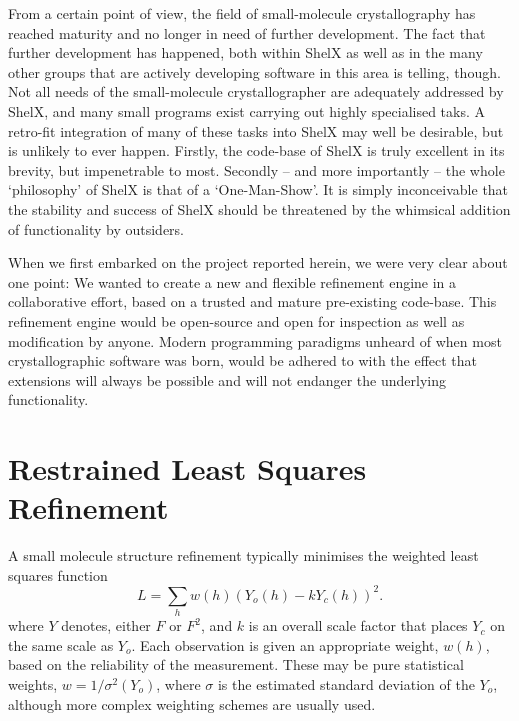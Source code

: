 \documentclass[pdf]{iucr}
\begin{document}
From a certain point of view, the field of small-molecule crystallography has reached maturity and no longer in need of further development. The fact that further development has happened, both within ShelX as well as in the many other groups that are actively developing software in this area is telling, though. Not all needs of the small-molecule crystallographer are adequately addressed by ShelX, and many small programs exist carrying out highly specialised taks. A retro-fit integration of many of these tasks into ShelX may well be desirable, but is unlikely to ever happen. Firstly, the code-base of ShelX is truly excellent in its brevity, but impenetrable to most. Secondly -- and more importantly -- the whole `philosophy' of ShelX is that of a `One-Man-Show'.  It is simply inconceivable that the stability and success of ShelX should be threatened by the whimsical addition of functionality by outsiders.

When we first embarked on the project reported herein, we were very clear about one point: We wanted to create a new and flexible refinement engine in a collaborative effort, based on a trusted and mature pre-existing code-base. This refinement engine would be open-source and open for inspection as well as modification by anyone. Modern programming paradigms unheard of when most crystallographic software was born, would be adhered to with the effect that extensions will always be possible and will not endanger the underlying functionality.


\section{Restrained Least Squares Refinement}
\label{sec:restraints}

A small molecule structure refinement typically minimises the weighted least squares function
\begin{equation}
L = \sum_h w(h) (Y_o(h) - k Y_c(h))^2.
\label{eqn:L:def}
\end{equation}
where $Y$ denotes, either $F$ or $F^2$, and $k$ is an overall scale factor that places $Y_c$ on the same scale as $Y_o$. Each observation is given an appropriate weight, $w(h)$, based on the reliability of the measurement. These may be pure statistical weights, $w = 1/\sigma^2(Y_o)$, where $\sigma$ is the estimated standard deviation of the $Y_o$, although more complex weighting schemes are usually used.
%
\end{document}
